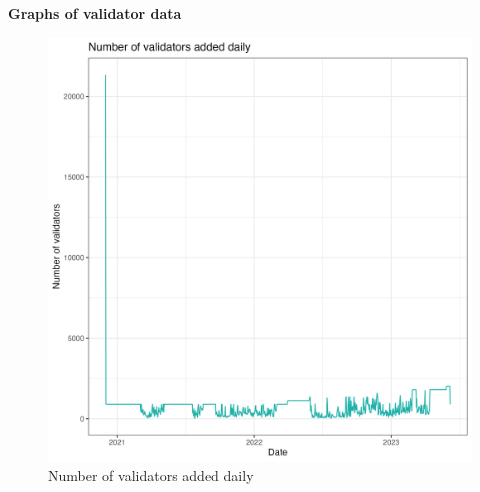 \documentclass[UTF8]{article}
\begin{document}
\textbf{Graphs of validator data}
 \begin{figure}[htbp]
\begin{center}
\includegraphics[width=\linewidth]{images/daily_validator_plot_230607}             %
\caption{Number of validators added daily}
\label{fig:dailyvalidator1}
\end{center}
\end{figure} 
\end{document}
